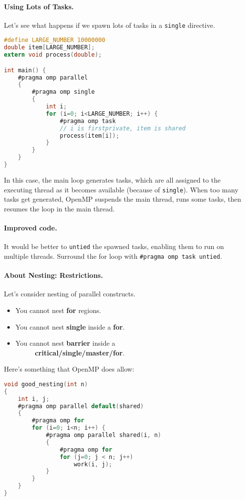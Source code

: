 \paragraph{Using Lots of Tasks.} Let's see what happens
if we spawn lots of tasks in a {\tt single} directive.

  \begin{lstlisting}[language=C]
#define LARGE_NUMBER 10000000
double item[LARGE_NUMBER];
extern void process(double);

int main() {
    #pragma omp parallel
    {
        #pragma omp single
        {
            int i;
            for (i=0; i<LARGE_NUMBER; i++) {
                #pragma omp task
                // i is firstprivate, item is shared
                process(item[i]);
            }
        }
    }
}
  \end{lstlisting}

In this case, the main loop generates tasks, which are all assigned to the executing thread as it becomes available (because of {\tt single}).
When too many tasks get generated, OpenMP suspends the main thread, runs some tasks, then resumes the loop in the main thread.

\paragraph{Improved code.} It would be better to {\tt untied} the
spawned tasks, enabling them to run on multiple threads. Surround
the for loop with \verb+#pragma omp task untied+.

\paragraph{About Nesting: Restrictions.}
Let's consider nesting of parallel constructs.
  \begin{itemize}
    \item You cannot nest {\bf for} regions.
    \item You cannot nest {\bf single} inside a {\bf for}.
    \item You cannot nest {\bf barrier} inside a\\~~~~~ {\bf critical/single/master/for}.
  \end{itemize}

Here's something that OpenMP does allow:
  \begin{lstlisting}[language=C]
void good_nesting(int n)
{
    int i, j;
    #pragma omp parallel default(shared)
    {
        #pragma omp for
        for (i=0; i<n; i++) {
            #pragma omp parallel shared(i, n)
            {
                #pragma omp for
                for (j=0; j < n; j++)
                    work(i, j);
            }
        }
    }
}
  \end{lstlisting}

